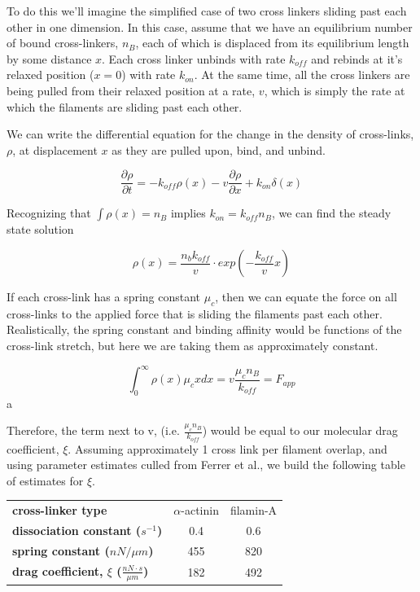 To do this we'll imagine the simplified case of two cross linkers sliding past each other in one dimension.  In this case, assume that we have an equilibrium number of bound cross-linkers, $n_B$, each of which is displaced from its equilibrium length by some distance $x$.  Each cross linker unbinds with rate $k_{off}$ and rebinds at it's relaxed position ($x=0$) with rate $k_{on}$.  At the same time, all the cross linkers are being pulled from their relaxed position at a rate, $v$, which is simply the rate at which the filaments are sliding past each other.  

We can write the differential equation for the change in the density of cross-links, $\rho$, at displacement $x$ as they are pulled upon, bind, and unbind.

\begin{equation}
\frac{\partial \rho}{\partial t} = -k_{off}\rho(x) - v\frac{\partial \rho}{\partial x} + k_{on}\delta(x)
\end{equation}

Recognizing that $\int \rho(x)=n_B$ implies $k_{on}=k_{off}n_B$, we can find the steady state solution

\begin{equation}
\rho(x) = \frac{n_b k_{off}}{v}\cdot exp\left ( -\frac{k_{off}}{v}x \right )
\end{equation}

If each cross-link has a spring constant $\mu_c$, then we can equate the force on all cross-links to the applied force that is sliding the filaments past each other.  Realistically, the spring constant and binding affinity would be functions of the cross-link stretch, but here we are taking them as approximately constant.  

\begin{equation}
\int_{0}^{\infty}\rho(x)\mu_cx dx = v \frac{\mu_c n_B}{k_{off}}= F_{app}
\end{equation}a

Therefore, the term next to v, (i.e. $\tfrac{\mu_c n_B}{k_{off}}$) would be equal to our molecular drag coefficient, $\xi$.  Assuming approximately 1 cross link per filament overlap, and using parameter estimates culled from Ferrer et al., we build the following table of estimates for $\xi$.

\begin{table}[h]
\begin{tabular}{| l | c | c |}
\hline
\textbf{cross-linker type} & $\alpha$-actinin & filamin-A  \\ \cline{1-1}
\textbf{dissociation constant ($s^{-1}$)} & 0.4 & 0.6 \\ \cline{1-1}
\textbf{spring constant ($nN / \mu m$)} & 455 & 820 \\ \cline{1-1}
\textbf{drag coefficient, $\xi$ ($\tfrac{nN \cdot s}{\mu m}$)} & 182 & 492 \\ 
\hline
\end{tabular}
\end{table}



